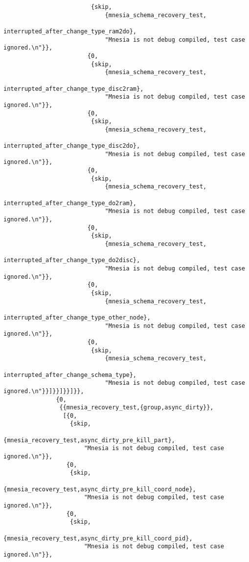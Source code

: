 \begin{verbatim}
                         {skip,
                             {mnesia_schema_recovery_test,
                                 interrupted_after_change_type_ram2do},
                             "Mnesia is not debug compiled, test case ignored.\n"}},
                        {0,
                         {skip,
                             {mnesia_schema_recovery_test,
                                 interrupted_after_change_type_disc2ram},
                             "Mnesia is not debug compiled, test case ignored.\n"}},
                        {0,
                         {skip,
                             {mnesia_schema_recovery_test,
                                 interrupted_after_change_type_disc2do},
                             "Mnesia is not debug compiled, test case ignored.\n"}},
                        {0,
                         {skip,
                             {mnesia_schema_recovery_test,
                                 interrupted_after_change_type_do2ram},
                             "Mnesia is not debug compiled, test case ignored.\n"}},
                        {0,
                         {skip,
                             {mnesia_schema_recovery_test,
                                 interrupted_after_change_type_do2disc},
                             "Mnesia is not debug compiled, test case ignored.\n"}},
                        {0,
                         {skip,
                             {mnesia_schema_recovery_test,
                                 interrupted_after_change_type_other_node},
                             "Mnesia is not debug compiled, test case ignored.\n"}},
                        {0,
                         {skip,
                             {mnesia_schema_recovery_test,
                                 interrupted_after_change_schema_type},
                             "Mnesia is not debug compiled, test case ignored.\n"}}]}}]}}]}},
               {0,
                {{mnesia_recovery_test,{group,async_dirty}},
                 [{0,
                   {skip,
                       {mnesia_recovery_test,async_dirty_pre_kill_part},
                       "Mnesia is not debug compiled, test case ignored.\n"}},
                  {0,
                   {skip,
                       {mnesia_recovery_test,async_dirty_pre_kill_coord_node},
                       "Mnesia is not debug compiled, test case ignored.\n"}},
                  {0,
                   {skip,
                       {mnesia_recovery_test,async_dirty_pre_kill_coord_pid},
                       "Mnesia is not debug compiled, test case ignored.\n"}},

\end{verbatim}
